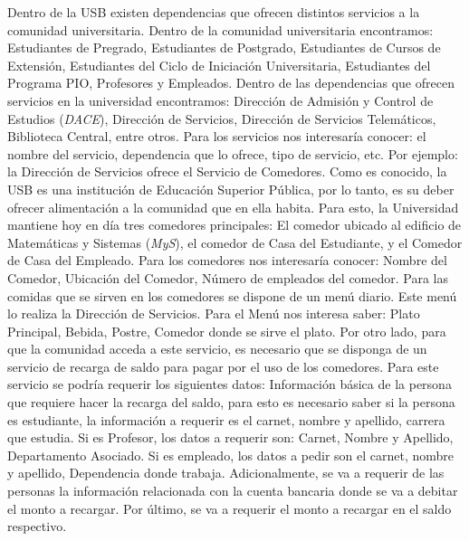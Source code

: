 \documentclass[12pt,a4paper,spanish]{article}
\begin{document}
\indent Dentro de la USB existen dependencias que ofrecen distintos
servicios a la comunidad universitaria. Dentro de la comunidad
universitaria encontramos: Estudiantes de Pregrado, Estudiantes de
Postgrado, Estudiantes de Cursos de Extensi\'on, Estudiantes del Ciclo
de Iniciaci\'on Universitaria, Estudiantes del Programa PIO,
Profesores y Empleados. Dentro de las dependencias que ofrecen
servicios en la universidad encontramos: Direcci\'on de Admisi\'on y
Control de Estudios (\emph{DACE}), Direcci\'on de Servicios,
Direcci\'on de Servicios Telem\'aticos, Biblioteca Central, entre
otros.
\newline
\newline
\indent Para los servicios nos interesar\'ia conocer: el nombre del
servicio, dependencia que lo ofrece, tipo de servicio, etc. Por
ejemplo: la Direcci\'on de Servicios ofrece el Servicio de
Comedores. Como es conocido, la USB es una instituci\'on de
Educaci\'on Superior P\'ublica, por lo tanto, es su deber ofrecer
alimentaci\'on a la comunidad que en ella habita. Para esto, la
Universidad mantiene hoy en d\'ia tres comedores principales: El
comedor ubicado al edificio de Matem\'aticas y Sistemas (\emph{MyS}),
el comedor de Casa del Estudiante, y el Comedor de Casa del
Empleado. Para los comedores nos interesar\'ia conocer: Nombre del
Comedor, Ubicaci\'on del Comedor, N\'umero de empleados del
comedor. Para las comidas que se sirven en los comedores se dispone de
un men\'u diario. Este men\'u lo realiza la Direcci\'on de
Servicios. Para el Men\'u nos interesa saber: Plato Principal, Bebida,
Postre, Comedor donde se sirve el plato. 
\newline
\newline
\indent Por otro lado, para que la comunidad acceda a este servicio,
es necesario que se disponga de un servicio de recarga de saldo para
pagar por el uso de los comedores. Para este servicio se podr\'ia
requerir los siguientes datos: Informaci\'on b\'asica de la persona
que requiere hacer la recarga del saldo, para esto es necesario
saber si la persona es estudiante, la informaci\'on a requerir es el
carnet, nombre y apellido, carrera que estudia. Si es Profesor, los
datos a requerir son: Carnet, Nombre y Apellido, Departamento
Asociado. Si es empleado, los datos a pedir son el carnet, nombre y
apellido, Dependencia donde trabaja. Adicionalmente, se va a requerir
de las personas la informaci\'on relacionada con la cuenta bancaria
donde se va a debitar el monto a recargar. Por \'ultimo, se va a
requerir el monto a recargar en el saldo respectivo.
\newline
\end{document}
